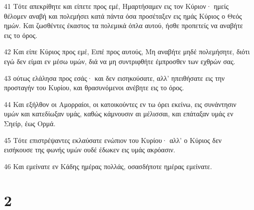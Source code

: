 \par 41 Τότε απεκρίθητε και είπετε προς εμέ, Ημαρτήσαμεν εις τον Κύριον· ημείς θέλομεν αναβή και πολεμήσει κατά πάντα όσα προσέταξεν εις ημάς Κύριος ο Θεός ημών. Και ζωσθέντες έκαστος τα πολεμικά όπλα αυτού, ήσθε προπετείς να αναβήτε εις το όρος.
\par 42 Και είπε Κύριος προς εμέ, Ειπέ προς αυτούς, Μη αναβήτε μηδέ πολεμήσητε, διότι εγώ δεν είμαι εν μέσω υμών, διά να μη συντριφθήτε έμπροσθεν των εχθρών σας.
\par 43 ούτως ελάλησα προς εσάς· και δεν εισηκούσατε, αλλ' ηπειθήσατε εις την προσταγήν του Κυρίου, και θρασυνόμενοι ανέβητε εις το όρος.
\par 44 Και εξήλθον οι Αμορραίοι, οι κατοικούντες εν τω όρει εκείνω, εις συνάντησιν υμών και κατεδίωξαν υμάς, καθώς κάμνουσιν αι μέλισσαι, και επάταξαν υμάς εν Σηείρ, έως Ορμά.
\par 45 Τότε επιστρέψαντες εκλαύσατε ενώπιον του Κυρίου· αλλ' ο Κύριος δεν εισήκουσε της φωνής υμών ουδέ έδωκεν εις υμάς ακρόασιν.
\par 46 Και εμείνατε εν Κάδης ημέρας πολλάς, οσασδήποτε ημέρας εμείνατε.

\chapter{2}

